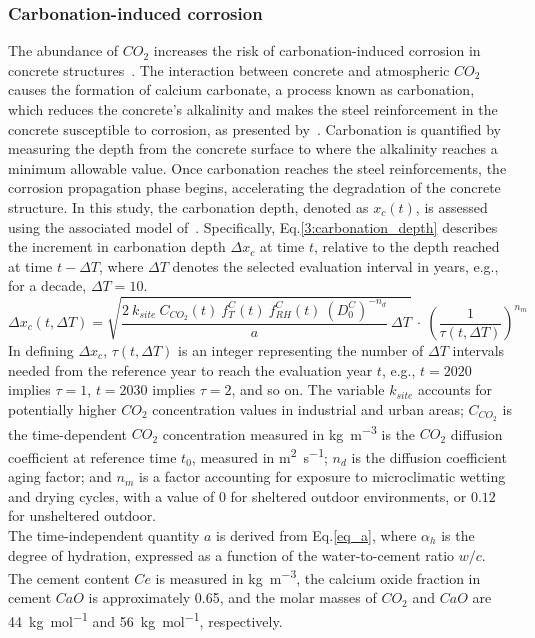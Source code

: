 \subsubsection{Carbonation-induced corrosion}\label{Carbonation_corrosion_Chpt}
The abundance of $CO_2$ increases the risk of carbonation-induced corrosion in concrete structures~\cite{TALUKDAR_part1,TALUKDAR_part2}. 
The interaction between concrete and atmospheric $CO_2$ causes the formation of calcium carbonate, a process known as carbonation, which reduces the concrete's alkalinity and makes the steel reinforcement in the concrete susceptible to corrosion, as presented by~\textcite{GLASSER2008226}.
Carbonation is quantified by measuring the depth from the concrete surface to where the alkalinity reaches a minimum allowable value. 
Once carbonation reaches the steel reinforcements, the corrosion propagation phase begins, accelerating the degradation of the concrete structure.
In this study, the carbonation depth, denoted as $x_c(t)$, is assessed using the associated model of~\textcite{Carb_eq_STEWART,Carb_eq_BASTIDASARTEAGA}.
Specifically, Eq.\ref{3:carbonation_depth} describes the increment in carbonation depth $\Delta x_c$ at time $t$, relative to the depth reached at time $t-\Delta T$, where $\Delta T$ denotes the selected evaluation interval in years, e.g., for a decade, $\Delta T = 10$.
\begin{equation}
    \label{3:carbonation_depth}
    \Delta x_c(t, \Delta T) = \sqrt{\frac{2 \ k_{site} \ C_{CO_2}(t) \ f_T^C(t) \ f_{RH}^C(t) \ (D_0^C)^{-n_d}}{a} \ \Delta T} \ \cdot \ \left( \frac{1}{\tau (t, \Delta T)} \right)^{n_m} 
\end{equation}
In defining $\Delta x_c$, $\tau (t, \Delta T)$ is an integer representing the number of $\Delta T$ intervals needed from the reference year to reach the evaluation year $t$, e.g., $t = 2020$ implies $\tau = 1$, $t = 2030$ implies $\tau = 2$, and so on.
The variable $k_{site}$ accounts for potentially higher $CO_2$ concentration values in industrial and urban areas; $C_{CO_2}$ is the time-dependent $CO_2$ concentration measured in \si{\kilogram\per\cubic\meter} is the $CO_2$ diffusion coefficient at reference time $t_0$, measured in \si{\square\meter\per\second}; $n_d$ is the diffusion coefficient aging factor; and $n_m$ is a factor accounting for exposure to microclimatic wetting and drying cycles, with a value of $0$ for sheltered outdoor environments, or $0.12$ for unsheltered outdoor. \\
The time-independent quantity $a$ is derived from Eq.\ref{eq_a}, where $\alpha_h$ is the degree of hydration, expressed as a function of the water-to-cement ratio $w / c$. The cement content $Ce$ is measured in \si{\kilogram\per\cubic\meter}, the calcium oxide fraction in cement $CaO$ is approximately 0.65, and the molar masses of $CO_2$ and $CaO$ are \SI{44}{\kilogram\per\mole} and \SI{56}{\kilogram\per\mole}, respectively.
